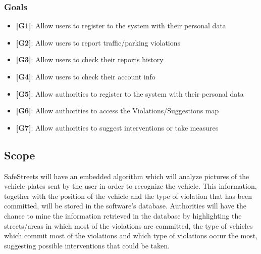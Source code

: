 \documentclass[12pt,a4paper]{article}
\begin{document}
\subsubsection{Goals}
\begin{itemize}
\item {\textbf[}\textbf{G1}{\textbf]}: Allow users to register to the system with their personal data
\item {\textbf[}\textbf{G2}{\textbf]}: Allow users to report traffic/parking violations 
\item {\textbf[}\textbf{G3}{\textbf]}: Allow users to check their reports history
\item {\textbf[}\textbf{G4}{\textbf]}: Allow users to check their account info
\item {\textbf[}\textbf{G5}{\textbf]}: Allow authorities to register to the system with their personal data
\item {\textbf[}\textbf{G6}{\textbf]}: Allow authorities to access the Violations/Suggestions map
\item {\textbf[}\textbf{G7}{\textbf]}: Allow authorities to suggest interventions or take measures
\end{itemize}
\subsection{Scope}
SafeStreets will have an embedded algorithm which will analyze pictures of the vehicle plates sent by the user in order to recognize the vehicle. This information, together with the position of the vehicle and the type of violation that has been committed, will be stored in the software's database.
\newline
Authorities will have the chance to mine the information retrieved in the database by highlighting the streets/areas in which most of the violations are committed, the type of vehicles which commit most of the violations and which type of violations occur the most, suggesting possible interventions that could be taken.	
\end{document}
